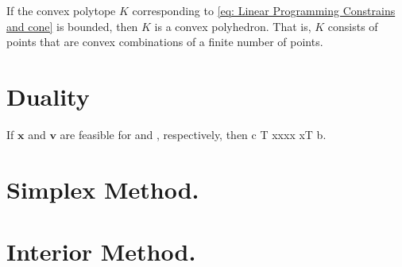 \begin{corollary}
	If the convex polytope $K$ corresponding to \eqref{eq: Linear Programming Constrains and cone} is bounded, then $K$ is a convex polyhedron. That is, $K$ consists of points that are convex combinations of a finite number of points.
\end{corollary}
\section{Duality}

\begin{lemma}
If $\mathbf{x}$ and $\mathbf{v}$ are feasible for  and , respectively, then c T xxxx xT b.
\end{lemma}
\section{Simplex Method.}

\section{Interior Method.}
